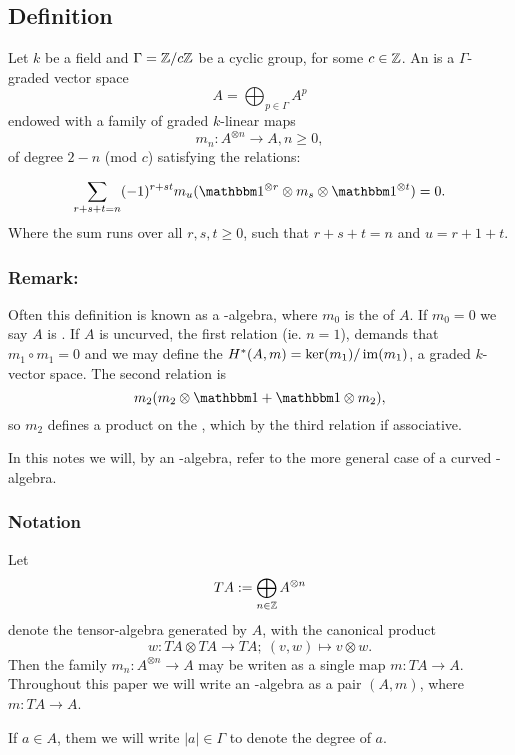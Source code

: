 
\subsection{Definition}

\begin{defn}
Let $k$ be a field and $\Gamma = \mathbb{Z}/c\mathbb{Z}$ be a cyclic group, for some
$c\in \mathbb{Z}$. An  is a $\Gamma$-graded 
vector space
\[ A = \bigoplus_{p\in\Gamma} A^p  \]
endowed with a family of graded $k$-linear maps
\[ m_n: A^{\otimes n} \to A, n \ge 0, \]
of degree $2-n$ (mod $c$) satisfying the \Ainf relations:

\begin{equation}
\label{eq:Ainf_rels}
\sum_{r+s+t = n} (-1)^{r+st} m_u(\I^{\otimes r} \otimes m_s \otimes \I^{\otimes t}) = 0.
\end{equation}
Where the sum runs over all $r,s,t \ge 0$, such that $r+s+t=n$ and $u = r+1+t$. 
\end{defn}

\subsubsection{Remark:}
Often this definition is known as a  \Ainf-algebra, where $m_0$ is the  of $A$. If $m_0 = 0$ we say $A$ is .
If $A$ is uncurved, the first \Ainf relation
(ie. $n=1$), demands that $m_1 \circ m_1 = 0$ and we may define the 
$H^*(A,m) = \operatorname{ker}(m_1)/\operatorname{im}(m_1)$, a graded $k$-vector space.
The second \Ainf relation is
\[ m_2(m_2 \otimes \I + \I \otimes m_2), \]
so $m_2$ defines a product on the , which by the third relation if associative.

In this notes we will, by an \Ainf-algebra, refer to the more general
case of a curved \Ainf-algebra.

\subsubsection{Notation}
Let
\[ TA := \bigoplus_{n\in\mathbb{Z}} A^{\otimes n} \]
denote the tensor-algebra generated by $A$, with the canonical product 
\[ w: TA\otimes TA \to TA; \: (v,w) \mapsto v\otimes w. \]
Then the family $m_n: A^{\otimes n} \to A$ may be writen as a single map $m: TA \to
A$. Throughout this paper we will write an \Ainf-algebra as a pair $(A,m)$, where 
$m: TA \to A$.

If $a \in A$, them we will write $|a| \in \Gamma$ to denote the degree of $a$.

